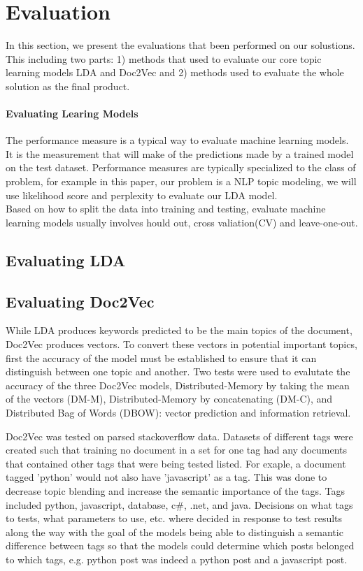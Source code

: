 
\section{Evaluation}
In this section, we present the evaluations that been performed on our solustions. This including two parts: 1) methods that used to evaluate our core topic learning models LDA and Doc2Vec and 2) methods used to evaluate the whole solution as the final product. 
\paragraph{Evaluating Learing Models}
The performance measure is a typical way to evaluate machine learning models. It is the measurement that will make of the predictions made by a trained model on the test dataset. Performance measures are typically specialized to the class of problem, for example in this paper, our problem is a NLP topic modeling, we will use likelihood score and perplexity to evaluate our LDA model.\\
Based on how to split the data into training and testing, evaluate machine learning models usually involves hould out, cross valiation(CV) and leave-one-out. 

\subsection{Evaluating LDA}


\subsection{Evaluating Doc2Vec}
While LDA produces keywords predicted to be the main topics of the document, Doc2Vec produces vectors. To convert these vectors in potential important topics, first the accuracy of the model must be established to ensure that it can distinguish between one topic and another. Two tests were used to evalutate the accuracy of the three Doc2Vec models, Distributed-Memory by taking the mean of the vectors (DM-M), Distributed-Memory by concatenating (DM-C), and Distributed Bag of Words (DBOW): vector prediction and information retrieval.

Doc2Vec was tested on parsed stackoverflow data. Datasets of different tags were created such that training no document in a set for one tag had any documents that contained other tags that were being tested listed. For exaple, a document tagged 'python' would not also have 'javascript' as a tag. This was done to decrease topic blending and increase the semantic importance of the tags. Tags included python, javascript, database, c\#, .net, and java. Decisions on what tags to tests, what parameters to use, etc. where decided in response to test results along the way with the goal of the models being able to distinguish a semantic difference between tags so that the models could determine which posts belonged to which tags, e.g. python post was indeed a python post and a javascript post.

